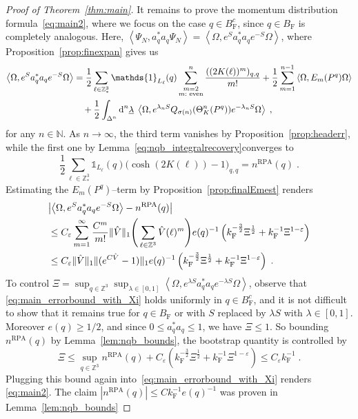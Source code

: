 \documentclass[12pt,a4paper]{article}
\numberwithin{equation}{section}
\newcommand{\1}{\mathbb{I}}
\newcommand{\di}{\textnormal{d}}
\newcommand{\F}{\mathrm{F}}
\newcommand{\RPA}{\mathrm{RPA}}
\newcommand{\N}{\mathbb{N}}
\newcommand{\Z}{\mathbb{Z}}
\newcommand{\half}{\frac{1}{2}}
\newcommand{\eva}[1]{\left\langle #1 \right\rangle}
\theoremstyle{plain}
\theoremstyle{definition}
\theoremstyle{remark}
\theoremstyle{plain}
\theoremstyle{definition}
\theoremstyle{remark}
\begin{document}
\begin{proof}[Proof of Theorem~\ref{thm:main}]
It remains to prove the momentum distribution formula~\eqref{eq:main2}, where we focus on the case $ q \in B_{\F}^c $, since $ q \in B_{\F} $ is completely analogous. Here, $ \eva{\Psi_N, a_q^* a_q \Psi_N} = \eva{\Omega, e^{S} a_q^* a_q e^{-S} \Omega} $, where Proposition~\ref{prop:finexpan} gives us
\begin{align*}
	\eva{\Omega, e^{S} a_q^* a_q e^{-S} \Omega} 
	&= \half\sum_{\ell\in \Z^3_*}\mathds{1}_{L_\ell}(q) \sum_{\substack{m=2\\m:\textnormal{ even}}}^n \frac{((2K(\ell))^m)_{q,q}}{m!}
		+ \half \sum_{m=1}^{n-1} \eva{\Omega, E_m(P^q)\Omega}\nonumber\\
	&\quad +\half \int_{\Delta^n} \di^n\underline{\lambda} \;
		\eva{\Omega, e^{\lambda_n S}Q_{\sigma(n)}(\Theta^n_{K}(P^q)) e^{-\lambda_n S} \Omega} \;,
\end{align*}
for any $ n \in \N $. As $ n \to \infty $, the third term vanishes by Proposition~\ref{prop:headerr}, while the first one by Lemma~\ref{eq:nqb_integralrecovery}converges to
\begin{equation*}
	\half\sum_{\ell\in \Z^3_*}\mathds{1}_{L_\ell}(q) \big( \cosh(2K(\ell)) - 1 \big)_{q,q}
	= n^{\RPA}(q) \;.
\end{equation*}
Estimating the $ E_m(P^q) $--term by Proposition~\ref{prop:finalEmest} renders
\begin{equation} \label{eq:main_errorbound_with_Xi}
\begin{aligned}
	& \abs{\eva{\Omega, e^{S} a_q^* a_q e^{-S} \Omega} - n^{\textnormal{RPA}}(q)} \\
	&\le C_\varepsilon \sum_{m=1}^\infty \frac{C^m}{m!} \Vert \hat{V} \Vert_1
		\Bigg( \sum_{\ell \in \Z^3} \hat{V}(\ell)^m \Bigg)
		e(q)^{-1} \left( k_{\F}^{-\frac{3}{2}} \Xi^\half
		+ k_{\F}^{-1}\Xi^{1-\varepsilon} \right) \\
	&\le C_\varepsilon \Vert \hat{V} \Vert_1 \Vert (e^{C \hat{V}}-1) \Vert_1
		e(q)^{-1} \left( k_{\F}^{-\frac{3}{2}} \Xi^\half
		+ k_{\F}^{-1}\Xi^{1-\varepsilon} \right) \;.
\end{aligned}
\end{equation}
To control $ \Xi = \sup_{q \in \Z^3} \sup_{\lambda \in [0,1]} \eva{\Omega, e^{\lambda S} a_q^* a_q e^{- \lambda S} \Omega} $, observe that \eqref{eq:main_errorbound_with_Xi} holds uniformly in $ q \in B_{\F}^c $, and it is not difficult to show that it remains true for $ q \in B_{\F} $ or with $ S $ replaced by $ \lambda S $ with $ \lambda \in [0,1] $. Moreover $ e(q) \ge 1/2 $, and since $ 0 \le a_q^* a_q \le 1 $, we have $ \Xi \le 1 $. So bounding $ n^{\RPA}(q) $ by Lemma~\ref{lem:nqb_bounds}, the bootstrap quantity is controlled by
\begin{equation}
	\Xi
	\le \sup_{q \in \Z^3} n^{\RPA}(q) + C_\varepsilon \left( k_{\F}^{-\frac{3}{2}} \Xi^\half
		+ k_{\F}^{-1}\Xi^{1-\varepsilon} \right)
	\le C_\varepsilon k_{\F}^{-1} \;.
\end{equation}
Plugging this bound again into~\eqref{eq:main_errorbound_with_Xi} renders \eqref{eq:main2}. The claim $ |n^{\RPA}(q)| \le C k_{\F}^{-1} e(q)^{-1} $ was proven in Lemma~\ref{lem:nqb_bounds}
\end{proof}
\end{document}
